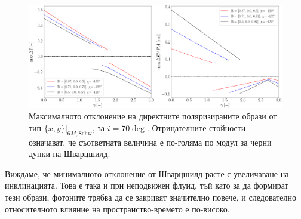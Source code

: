\begin{figure}[!htb]
	\centering
	\includegraphics[scale = 0.22]{WH_70_deg_param_sweep.png}
	\caption[Максималното отклонение на директните поляризираните образи от тип $\{x,y\}\vert_{6M, \text{Schw}}$, за $i = 70\deg$]{\small Максималното отклонение на директните поляризираните образи от тип $\{x,y\}\vert_{6M, \text{Schw}}$, за $i = 70\deg$. Отрицателните стойности означават, че съответната величина е по-голяма по модул за черни дупки на Шварцшилд.} 
	\label{WH_max_deviation_70_deg}
\end{figure}

Виждаме, че минималното отклонение от Шварцшилд расте с увеличаване на инклинацията. Това е така и при неподвижен флуид, тъй като за да формират тези образи, фотоните трябва да се закривят значително повече, и следователно относителното влияние на пространство-времето е по-високо.

